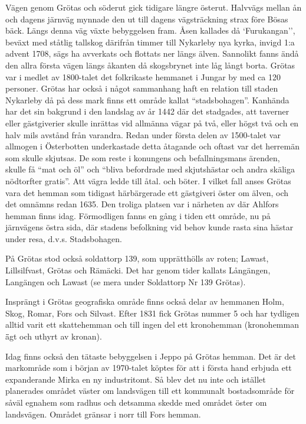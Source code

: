 Vägen genom Grötas och söderut gick tidigare längre österut. Halvvägs mellan ån och dagens järnväg mynnade den ut till dagens vägsträckning strax före Bösas bäck. Längs denna väg växte bebyggelsen fram. Åsen kallades då `Furukangan'', beväxt med ståtlig tallskog därifrån timmer till Nykarleby nya kyrka, invigd 1:a advent 1708, sägs ha avverkats och flottats ner längs älven. Sannolikt fanns ändå den allra första vägen längs åkanten då skogsbrynet inte låg långt borta. Grötas var i medlet av 1800-talet det folkrikaste hemmanet i Jungar by med ca 120 personer. Grötas har också i något sammanhang haft en relation till staden Nykarleby då på dess mark finns ett område kallat ``stadsbohagen''. Kanhända har det sin bakgrund i den landslag av år 1442 där det stadgades, att taverner eller gästgiverier skulle inrättas vid allmänna vägar på två, eller högst två och en halv mils avstånd från varandra. Redan under första delen av 1500-talet var allmogen i Österbotten underkastade detta åtagande och oftast var det herremän som skulle skjutsas. De som reste i konungens och befallningsmans ärenden, skulle få ``mat och öl'' och ``bliva befordrade med skjutshästar och andra skäliga nödtorfter gratis''. Att vägra ledde till åtal. och böter.  I vilket fall anses Grötas vara det hemman som tidigast härbärgerade ett gästgiveri öster om älven, och det omnämns redan 1635. Den troliga platsen var i närheten av där Ahlfors hemman finns idag. Förmodligen fanns en gång i tiden ett område, nu på järnvägens östra sida, där stadens befolkning vid behov kunde rasta sina hästar under resa, d.v.s. Stadsbohagen.

På Grötas stod också soldattorp 139, som upprätthölls av roten; Lawast, Lillsilfvast, Grötas och Rämäcki. Det har genom tider kallats Långängen, Langängen och Lawast (se mera under Soldattorp Nr 139 Grötas).

Insprängt i Grötas geografiska område finns också delar av hemmanen Holm, Skog, Romar, Fors och  Silvast. Efter 1831 fick Grötas nummer 5 och har tydligen alltid varit ett skattehemman och till ingen del ett kronohemman (kronohemman \= ägt och uthyrt av kronan).

Idag finns också den tätaste bebyggelsen i Jeppo på Grötas hemman. Det är det  markområde som i början av 1970-talet köptes för att i första hand erbjuda ett expanderande Mirka en ny industritomt. Så blev det nu inte och istället planerades området väster om landsvägen till ett kommunalt bostadsområde för såväl egnahem som radhus och detsamma skedde med området öster om landsvägen. Området gränsar i norr till Fors hemman.

